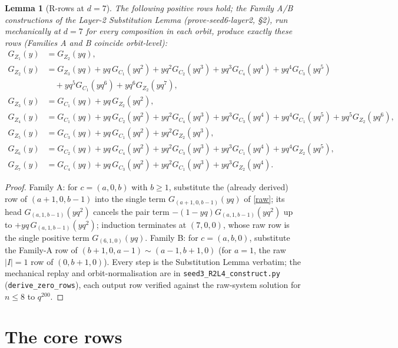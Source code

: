 \documentclass[11pt]{article}
\newtheorem{lemma}[theorem]{Lemma}
\newcommand{\G}[1]{G_{#1}}
\begin{document}
\begin{lemma}[R-rows at $d=7$]\label{zero}
The following positive rows hold; the Family A/B constructions of the Layer-2
Substitution Lemma (prove-seed6-layer2, \S2), run mechanically at $d=7$ for every
composition in each orbit, produce exactly these rows (Families A and B coincide
orbit-level):
\begin{align*}
\G{Z_1}(y)&=\G{Z_2}(yq),\\
\G{Z_2}(y)&=\G{Z_3}(yq)+yq\,\G{C_1}(yq^{2})+yq^{2}\G{C_2}(yq^{3})
 +yq^{3}\G{C_4}(yq^{4})+yq^{4}\G{C_3}(yq^{5})\\&\quad
 +yq^{5}\G{C_1}(yq^{6})+yq^{6}\G{Z_2}(yq^{7}),\\
\G{Z_3}(y)&=\G{C_1}(yq)+yq\,\G{Z_2}(yq^{2}),\\
\G{Z_4}(y)&=\G{C_1}(yq)+yq\,\G{C_2}(yq^{2})+yq^{2}\G{C_4}(yq^{3})
 +yq^{3}\G{C_3}(yq^{4})+yq^{4}\G{C_1}(yq^{5})+yq^{5}\G{Z_2}(yq^{6}),\\
\G{Z_5}(y)&=\G{C_3}(yq)+yq\,\G{C_1}(yq^{2})+yq^{2}\G{Z_2}(yq^{3}),\\
\G{Z_6}(y)&=\G{C_2}(yq)+yq\,\G{C_4}(yq^{2})+yq^{2}\G{C_3}(yq^{3})
 +yq^{3}\G{C_1}(yq^{4})+yq^{4}\G{Z_2}(yq^{5}),\\
\G{Z_7}(y)&=\G{C_4}(yq)+yq\,\G{C_3}(yq^{2})+yq^{2}\G{C_1}(yq^{3})
 +yq^{3}\G{Z_2}(yq^{4}).
\end{align*}
\end{lemma}

\begin{proof}
Family A: for $c=(a,0,b)$ with $b\ge1$, substitute the (already derived) row of
$(a{+}1,0,b{-}1)$ into the single term $G_{(a+1,0,b-1)}(yq)$ of \eqref{raw}; its
head $G_{(a,1,b-1)}(yq^{2})$ cancels the pair term $-(1-yq)G_{(a,1,b-1)}(yq^{2})$
up to $+yq\,G_{(a,1,b-1)}(yq^{2})$; induction terminates at $(7,0,0)$, whose raw
row is the single positive term $G_{(6,1,0)}(yq)$. Family B: for $c=(a,b,0)$,
substitute the Family-A row of $(b{+}1,0,a{-}1)\sim(a{-}1,b{+}1,0)$ (for $a=1$,
the raw $|I|=1$ row of $(0,b{+}1,0)$). Every step is the Substitution Lemma
verbatim; the mechanical replay and orbit-normalisation are in
\texttt{seed3\_R2L4\_construct.py} (\texttt{derive\_zero\_rows}), each output row
verified against the raw-system solution for $n\le8$ to $q^{200}$.
\end{proof}

\section{The core rows}
\end{document}
